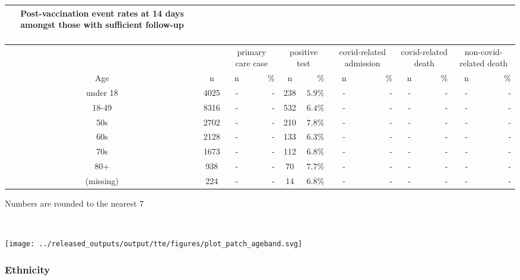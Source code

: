 \documentclass[
]{article}
\begin{document}
\captionsetup[table]{labelformat=empty,skip=1pt}
\begin{longtable}{cccrcrcrcrcr}
\caption*{
\large Post-vaccination event rates at 14 days amongst those with sufficient follow-up\\ 
\small \\ 
} \\ 
\toprule
& & \multicolumn{2}{c}{primary care case} & \multicolumn{2}{c}{positive test} & \multicolumn{2}{c}{covid-related admission} & \multicolumn{2}{c}{covid-related death} & \multicolumn{2}{c}{non-covid-related death} \\ 
 \cmidrule(lr){3-4}\cmidrule(lr){5-6}\cmidrule(lr){7-8}\cmidrule(lr){9-10}\cmidrule(lr){11-12}
Age & n & n & \% & n & \% & n & \% & n & \% & n & \% \\ 
\midrule
under 18 & 4025 & - & - & 238 & $5.9\%$ & - & - & - & - & - & - \\ 
18-49 & 8316 & - & - & 532 & $6.4\%$ & - & - & - & - & - & - \\ 
50s & 2702 & - & - & 210 & $7.8\%$ & - & - & - & - & - & - \\ 
60s & 2128 & - & - & 133 & $6.3\%$ & - & - & - & - & - & - \\ 
70s & 1673 & - & - & 112 & $6.8\%$ & - & - & - & - & - & - \\ 
80+ & 938 & - & - & 70 & $7.7\%$ & - & - & - & - & - & - \\ 
(missing) & 224 & - & - & 14 & $6.8\%$ & - & - & - & - & - & - \\ 
\bottomrule
\end{longtable}
\begin{minipage}{\linewidth}
Numbers are rounded to the nearest 7\\ 
\end{minipage}

~ ~

\texttt{[image: ../released\_outputs/output/tte/figures/plot\_patch\_ageband.svg]}

\hypertarget{ethnicity}{%
\subsubsection{Ethnicity}\label{ethnicity}}
\end{document}
